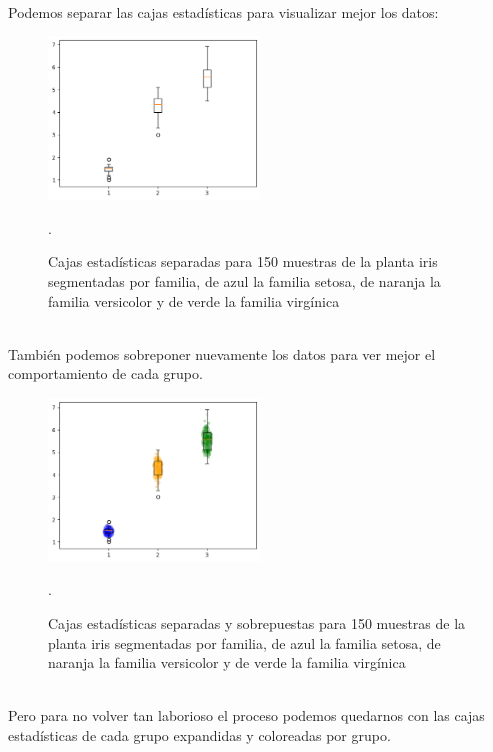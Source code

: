 \documentclass{article}
\begin{document}
\hfill\hfill\\
Podemos separar las cajas estadísticas para visualizar mejor los datos:
\begin{figure}[h]
    \centering
    \includegraphics[width=0.5\textwidth]{figures/box4.png}
    \captionsetup{width=0.8\textwidth}
    \caption{Cajas estadísticas separadas para 150 muestras de la planta iris segmentadas por familia, de azul la familia setosa, de naranja la familia versicolor y de verde la familia virgínica}.
    \label{fig:box4}
\end{figure}
\\
También podemos sobreponer nuevamente los datos para ver mejor el comportamiento de cada grupo.
\begin{figure}[h]
    \centering
    \includegraphics[width=0.5\textwidth]{figures/box5.png}
    \captionsetup{width=0.8\textwidth}
    \caption{Cajas estadísticas separadas y sobrepuestas para 150 muestras de la planta iris segmentadas por familia, de azul la familia setosa, de naranja la familia versicolor y de verde la familia virgínica}.
    \label{fig:box5}
\end{figure}
\\
Pero para no volver tan laborioso el proceso podemos quedarnos con las cajas estadísticas de cada grupo expandidas y coloreadas por grupo.

\clearpage
\end{document}
